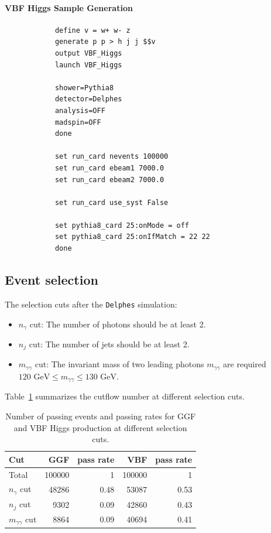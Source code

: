 \documentclass[12pt]{article}
\begin{document}
        \paragraph{VBF Higgs Sample Generation}
        \begin{lstlisting}
            define v = w+ w- z
            generate p p > h j j $$v
            output VBF_Higgs
            launch VBF_Higgs

            shower=Pythia8
            detector=Delphes
            analysis=OFF
            madspin=OFF
            done

            set run_card nevents 100000
            set run_card ebeam1 7000.0
            set run_card ebeam2 7000.0

            set run_card use_syst False

            set pythia8_card 25:onMode = off
            set pythia8_card 25:onIfMatch = 22 22
            done
        \end{lstlisting}
    \subsection{Event selection}%
    \label{sub:event_selection}
        The selection cuts after the \verb|Delphes| simulation:
        \begin{itemize}
            \item $n_{\gamma}$ cut: The number of photons should be at least 2.
            \item $n_{j}$ cut: The number of jets should be at least 2.
            \item $m_{\gamma\gamma}$ cut: The invariant mass of two leading photons $m_{\gamma\gamma}$ are required $\text{120 GeV} \le m_{\gamma\gamma} \le \text{130 GeV}$.
        \end{itemize}

        Table~\ref{tab:GGF_VBF_Higgs_cutflow_number} summarizes the cutflow number at different selection cuts.
        \begin{table}[htpb]
            \centering
            \caption{Number of passing events and passing rates for GGF and VBF Higgs production at different selection cuts.}
            \label{tab:GGF_VBF_Higgs_cutflow_number}
            \begin{tabular}{l|rr|rr}
                Cut                    & GGF    & pass rate & VBF    & pass rate \\ \hline
                Total                  & 100000 & 1         & 100000 & 1         \\
                $n_{\gamma}$ cut       & 48286  & 0.48      & 53087  & 0.53      \\
                $n_j$ cut              & 9302   & 0.09      & 42860  & 0.43      \\
                $m_{\gamma\gamma}$ cut & 8864   & 0.09      & 40694  & 0.41     
            \end{tabular}
        \end{table}
        
\end{document}
